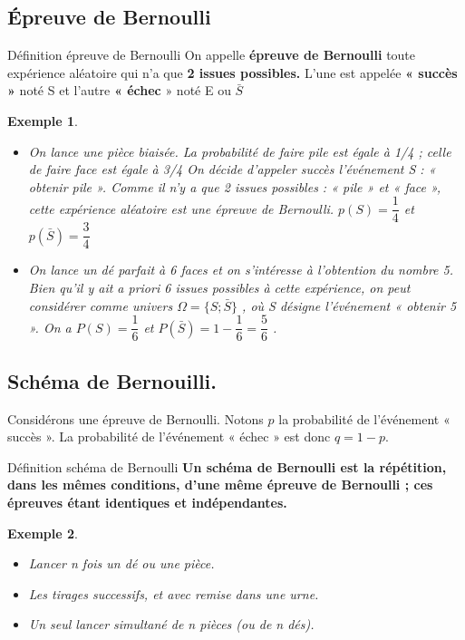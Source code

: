 \documentclass[10pt,a4paper]{article}
\theoremstyle{break}
\newtheorem{Ex}{Exemple}
\begin{document}
\subsection{Épreuve de Bernoulli}
\begin{bclogo}[couleur = yellow!30, arrondi = 0.1,logo=\bcbook]{Définition épreuve de Bernoulli}
	On appelle \textbf{épreuve de Bernoulli} toute expérience aléatoire qui n’a que \textbf{2 issues possibles. }
	L’une est appelée \textbf{« succès »} noté S et l’autre \textbf{« échec }» noté E ou $\bar{S }$
\end{bclogo}
\begin{Ex}
	\begin{itemize}
		\item On lance une pièce biaisée. La probabilité de faire pile est égale à 1/4 ; celle de faire face est égale à 3/4
		On décide d’appeler succès l’événement S : « obtenir pile ». Comme il n’y a que 2 issues possibles : « pile » et « face », cette expérience aléatoire est une épreuve de Bernoulli. $p (S) = \dfrac{1}{4}$ et $p( \bar{S}) =\dfrac{3}{4}$
		\item On lance un dé parfait à 6 faces et on s’intéresse à l’obtention du nombre 5. Bien qu’il y ait a priori 6 issues possibles à cette expérience, on peut considérer comme univers $\Omega = \{S ; \bar{S}\}$ , où S désigne l’événement « obtenir 5 ». On a $P( S)=\dfrac{1}{6}$  et $P(\bar{S} )=1-\dfrac{1}{6}=\dfrac{5}{6}$ .
	\end{itemize}
\end{Ex}
\subsection{Schéma de Bernouilli.}
Considérons une épreuve de Bernoulli. Notons $p$ la probabilité de l’événement « succès ». La probabilité de l’événement « échec » est donc $q=1-p$.
\begin{bclogo}[couleur = yellow!30,arrondi =0.1,logo =\bcbook]{ Définition schéma de Bernoulli}
	\textbf{Un schéma de Bernoulli est la répétition, dans les mêmes conditions, d’une même épreuve de Bernoulli ; ces épreuves étant identiques et indépendantes. }
	
\end{bclogo}

\begin{Ex}
	\begin{itemize}
		\item Lancer n fois un dé ou une pièce.
		\item Les tirages successifs, et avec remise dans une urne.
		\item Un seul lancer simultané de n pièces (ou de n dés).
		
	\end{itemize}
\end{Ex}
\end{document}
